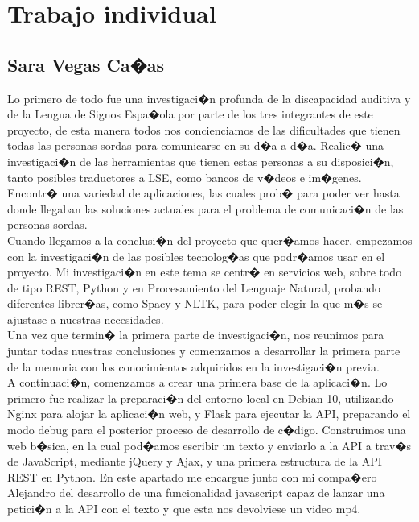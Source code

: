 %
%

\chapter{Trabajo individual}


\section{Sara Vegas Ca�as}
\label{capTrabajoIndividual:sec:Sara}

Lo primero de todo fue una investigaci�n profunda de la discapacidad auditiva y de la Lengua de Signos Espa�ola por parte de los tres integrantes de este proyecto, de esta manera todos nos concienciamos de las dificultades que tienen todas las personas sordas para comunicarse en su d�a a d�a. Realic� una investigaci�n de las herramientas que tienen estas personas a su disposici�n, tanto posibles traductores a LSE, como bancos de v�deos e im�genes. Encontr� una variedad de aplicaciones, las cuales prob� para poder ver hasta donde llegaban las soluciones actuales para el problema de comunicaci�n de las personas sordas. \\

Cuando llegamos a la conclusi�n del proyecto que quer�amos hacer, empezamos con la investigaci�n de las posibles tecnolog�as que podr�amos usar en el proyecto. Mi investigaci�n en este tema se centr� en servicios web, sobre todo de tipo REST, Python y en Procesamiento del Lenguaje Natural, probando diferentes librer�as, como Spacy y NLTK, para poder elegir la que m�s se ajustase a nuestras necesidades.\\

Una vez que termin� la primera parte de investigaci�n, nos reunimos para juntar todas nuestras conclusiones y comenzamos a desarrollar la primera parte de la memoria con los conocimientos adquiridos en la investigaci�n previa.\\

A continuaci�n, comenzamos a crear una primera base de la aplicaci�n. Lo primero fue realizar la preparaci�n del entorno local en Debian 10, utilizando Nginx para alojar la aplicaci�n web, y Flask para ejecutar la API, preparando el modo debug para el posterior proceso de desarrollo de c�digo. Construimos una web b�sica, en la cual pod�amos escribir un texto y enviarlo a la API a trav�s de JavaScript, mediante jQuery y Ajax, y una primera estructura de la API REST en Python. En este apartado me encargue junto con mi compa�ero Alejandro del desarrollo de una funcionalidad javascript capaz de lanzar una petici�n a la API con el texto y que esta nos devolviese un video mp4.\\

